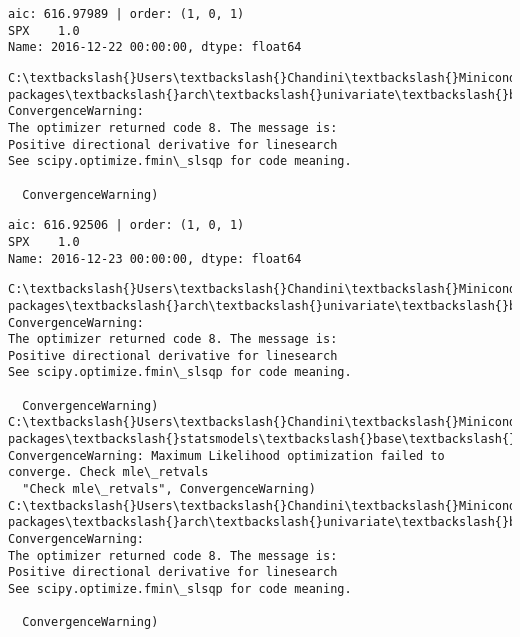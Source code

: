 \documentclass[11pt]{article}
\begin{document}
    \begin{Verbatim}[commandchars=\\\{\}]
aic: 616.97989 | order: (1, 0, 1)
SPX    1.0
Name: 2016-12-22 00:00:00, dtype: float64

    \end{Verbatim}

    \begin{Verbatim}[commandchars=\\\{\}]
C:\textbackslash{}Users\textbackslash{}Chandini\textbackslash{}Miniconda3\textbackslash{}envs\textbackslash{}auquan\textbackslash{}lib\textbackslash{}site-packages\textbackslash{}arch\textbackslash{}univariate\textbackslash{}base.py:513: ConvergenceWarning: 
The optimizer returned code 8. The message is:
Positive directional derivative for linesearch
See scipy.optimize.fmin\_slsqp for code meaning.

  ConvergenceWarning)

    \end{Verbatim}

    \begin{Verbatim}[commandchars=\\\{\}]
aic: 616.92506 | order: (1, 0, 1)
SPX    1.0
Name: 2016-12-23 00:00:00, dtype: float64

    \end{Verbatim}

    \begin{Verbatim}[commandchars=\\\{\}]
C:\textbackslash{}Users\textbackslash{}Chandini\textbackslash{}Miniconda3\textbackslash{}envs\textbackslash{}auquan\textbackslash{}lib\textbackslash{}site-packages\textbackslash{}arch\textbackslash{}univariate\textbackslash{}base.py:513: ConvergenceWarning: 
The optimizer returned code 8. The message is:
Positive directional derivative for linesearch
See scipy.optimize.fmin\_slsqp for code meaning.

  ConvergenceWarning)
C:\textbackslash{}Users\textbackslash{}Chandini\textbackslash{}Miniconda3\textbackslash{}envs\textbackslash{}auquan\textbackslash{}lib\textbackslash{}site-packages\textbackslash{}statsmodels\textbackslash{}base\textbackslash{}model.py:496: ConvergenceWarning: Maximum Likelihood optimization failed to converge. Check mle\_retvals
  "Check mle\_retvals", ConvergenceWarning)
C:\textbackslash{}Users\textbackslash{}Chandini\textbackslash{}Miniconda3\textbackslash{}envs\textbackslash{}auquan\textbackslash{}lib\textbackslash{}site-packages\textbackslash{}arch\textbackslash{}univariate\textbackslash{}base.py:513: ConvergenceWarning: 
The optimizer returned code 8. The message is:
Positive directional derivative for linesearch
See scipy.optimize.fmin\_slsqp for code meaning.

  ConvergenceWarning)

    \end{Verbatim}
\end{document}

